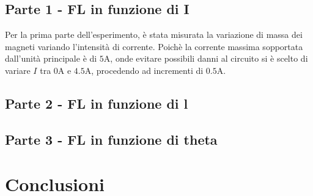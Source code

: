 \documentclass[11pt, a4paper]{article}
\numberwithin{equation}{section} %
\begin{document}
    \subsection{Parte 1 - FL in funzione di I}

    Per la prima parte dell'esperimento, è stata misurata la variazione di massa dei magneti variando l'intensità di corrente. Poichè la corrente massima sopportata dall'unità principale è di $5\text{A}$, onde evitare possibili danni al circuito si è scelto di variare $I$ tra $0\text{A}$ e $4.5\text{A}$, procedendo ad incrementi di $0.5\text{A}$.

    \subsection{Parte 2 - FL in funzione di l} %

    \subsection{Parte 3 - FL in funzione di theta}

    \section{Conclusioni}
\end{document}
